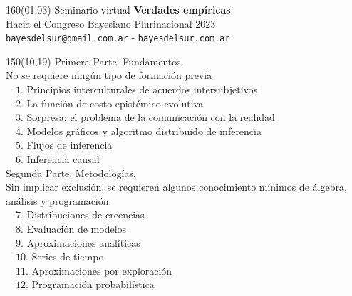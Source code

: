 \documentclass[shownotes,aspectratio=169]{beamer}
\begin{document}
\begin{frame}

\begin{textblock}{160}(01,03)\centering
\textcolor{black!85}{{\large
\large Seminario virtual \textbf{Verdades empíricas} \\[-0.1cm] \footnotesize Hacia el Congreso Bayesiano Plurinacional 2023}} \\ \scriptsize \texttt{bayesdelsur@gmail.com.ar} - \texttt{bayesdelsur.com.ar}
\end{textblock}


\begin{textblock}{150}(10,19)
\normalsize Primera Parte. Fundamentos. \\
\scriptsize No se requiere ningún tipo de formación previa \\[0.15cm] \footnotesize
\ \ $1$. Principios interculturales de acuerdos intersubjetivos \\
\ \ $2$. La función de costo epistémico-evolutiva\\
\ \ $3$. Sorpresa: el problema de la comunicación con la realidad \\
\ \ $4$. Modelos gráficos y algoritmo distribuido de inferencia\\
\ \ $5$. Flujos de inferencia \\
\ \ $6$. Inferencia causal \\[0.4cm]
\normalsize Segunda Parte. Metodologías.\scriptsize \\ Sin implicar exclusión, se requieren algunos conocimiento mínimos de álgebra, análisis y programación. \\[0.15cm] \footnotesize
\ \ $7$. Distribuciones de creencias \\
\ \ $8$. Evaluación de modelos \\
\ \ $9$. Aproximaciones analíticas \\
\ \ $10$. Series de tiempo\\
\ \ $11$. Aproximaciones por exploración \\
\ \ $12$. Programación probabilística\\
\end{textblock}


\end{frame}
\end{document}

